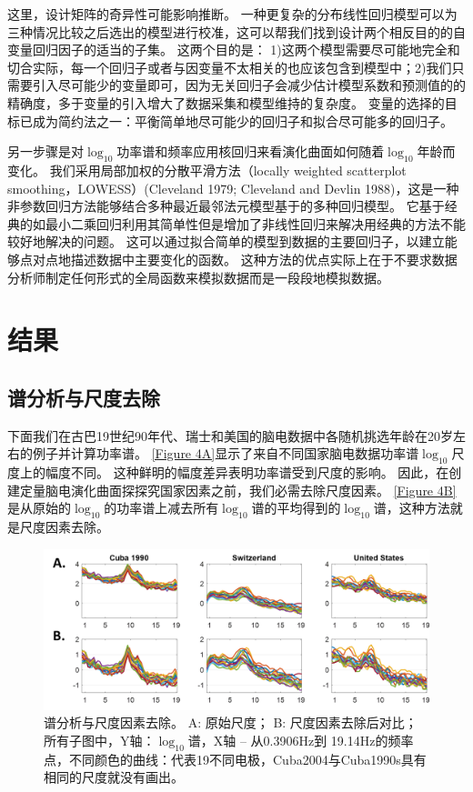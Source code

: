 这里，设计矩阵的奇异性可能影响推断。 一种更复杂的分布线性回归模型可以为三种情况比较之后选出的模型进行校准，这可以帮我们找到设计两个相反目的的自变量回归因子的适当的子集。 这两个目的是： 1)这两个模型需要尽可能地完全和切合实际，每一个回归子或者与因变量不太相关的也应该包含到模型中；2)我们只需要引入尽可能少的变量即可，因为无关回归子会减少估计模型系数和预测值的的精确度，多于变量的引入增大了数据采集和模型维持的复杂度。 变量的选择的目标已成为简约法之一：平衡简单地尽可能少的回归子和拟合尽可能多的回归子。

另一步骤是对$\log_{10}$功率谱和频率应用核回归来看演化曲面如何随着$\log_{10}年龄$而变化。 我们采用局部加权的分散平滑方法（locally weighted scatterplot smoothing，LOWESS）\citing{}(Cleveland 1979; Cleveland and Devlin 1988)，这是一种非参数回归方法能够结合多种最近最邻法元模型基于的多种回归模型。 它基于经典的如最小二乘回归利用其简单性但是增加了非线性回归来解决用经典的方法不能较好地解决的问题。 这可以通过拟合简单的模型到数据的主要回归子，以建立能够点对点地描述数据中主要变化的函数。 这种方法的优点实际上在于不要求数据分析师制定任何形式的全局函数来模拟数据而是一段段地模拟数据。

\section{结果}
\subsection{谱分析与尺度去除}
下面我们在古巴19世纪90年代、瑞士和美国的脑电数据中各随机挑选年龄在20岁左右的例子并计算功率谱。 \ref{Figure 4A}显示了来自不同国家脑电数据功率谱$\log_{10}$尺度上的幅度不同。 这种鲜明的幅度差异表明功率谱受到尺度的影响。 因此，在创建定量脑电演化曲面探探究国家因素之前，我们必需去除尺度因素。 \ref{Figure 4B}是从原始的$\log_{10}$的功率谱上减去所有$\log_{10}$谱的平均得到的$\log_{10}$谱，这种方法就是尺度因素去除。
\begin{figure}[!ht]
\includegraphics[width=15cm]{pic/Norm/figure4.png}
\caption{谱分析与尺度因素去除。 A: 原始尺度； B: 尺度因素去除后对比； 所有子图中，Y轴：$\log_{10}$谱，X轴 – 从0.3906Hz到 19.14Hz的频率点，不同颜色的曲线：代表19不同电极，Cuba2004与Cuba1990s具有相同的尺度就没有画出。}
\label{fig4}
\end{figure}

